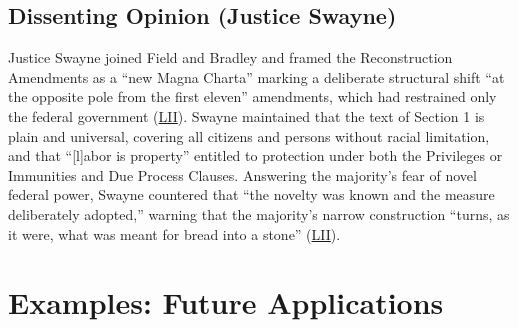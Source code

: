 \documentclass[12pt]{article}
\begin{document}
\subsection{Dissenting Opinion (Justice Swayne)}

Justice Swayne joined Field and Bradley and framed the Reconstruction Amendments as a ``new Magna Charta'' marking a deliberate structural shift ``at the opposite pole from the first eleven'' amendments, which had restrained only the federal government (\href{https://www.law.cornell.edu/supremecourt/text/83/36}{LII}). Swayne maintained that the text of Section 1 is plain and universal, covering all citizens and persons without racial limitation, and that ``[l]abor is property'' entitled to protection under both the Privileges or Immunities and Due Process Clauses. Answering the majority's fear of novel federal power, Swayne countered that ``the novelty was known and the measure deliberately adopted,'' warning that the majority's narrow construction ``turns, as it were, what was meant for bread into a stone'' (\href{https://www.law.cornell.edu/supremecourt/text/83/36}{LII}).

\section{Examples: Future Applications}
\end{document}
